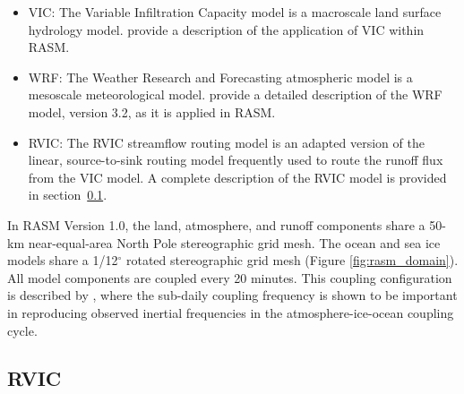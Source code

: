 \documentclass[jgrga, draft]{agutex}
\begin{document}
\begin{article}
\begin{itemize}[leftmargin=+.5in]
The POP model was initialized from a no-motion state, with climatological temperature and salinity fields derived from the University of Washington Polar Science Center Hydrographic Climatology version 3.0 \citep{Steele_2001}.
The model 75-year spin up consisted of an initial integration starting from 1948 through 1992 followed by a second integration from 1948 through 1979, both forced with $CORE.v2$ (see section \ref{sec:data}).

\item VIC: The Variable Infiltration Capacity model \citep{Liang_1994} is a macroscale land surface hydrology model.
\citet{Hamman_2016} provide a description of the application of VIC within RASM.
\item WRF: The Weather Research and Forecasting atmospheric model \citep{Skamarock_2007} is a mesoscale meteorological model.
\citet{Cassano_2016} provide a detailed description of the WRF model, version 3.2, as it is applied in RASM.
\item RVIC: The RVIC streamflow routing model is an adapted version of the \citet{Lohmann_1996} linear, source-to-sink routing model frequently used to route the runoff flux from the VIC model.
A complete description of the RVIC model is provided in section~\ref{sec:rvic}.
\end{itemize}

In RASM Version 1.0, the land, atmosphere, and runoff components share a 50-km near-equal-area North Pole stereographic grid mesh.
The ocean and sea ice models share a 1/12$^{\circ}$ rotated stereographic grid mesh (Figure \ref{fig:rasm_domain}).
All model components are coupled every 20 minutes.
This coupling configuration is described by \citet{Roberts_2015a}, where the sub-daily coupling frequency is shown to be important in reproducing observed inertial frequencies in the atmosphere-ice-ocean coupling cycle.

\subsection{RVIC}
\label{sec:rvic}


\end{article}
\end{document}
